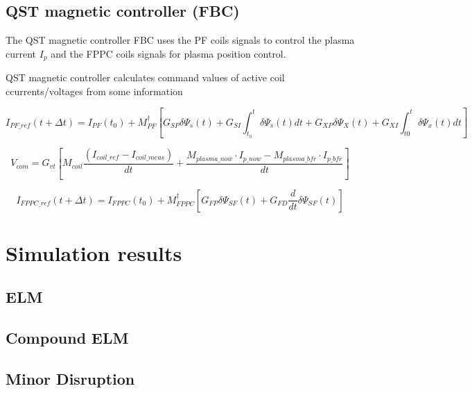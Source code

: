 \subsection{QST magnetic controller (FBC)}


The QST magnetic controller FBC uses the PF coils signals to control the plasma current $I_p$ and the FPPC coils signals for plasma position control.

QST magnetic controller calculates command values of active coil ccurrents/voltages from some information

\begin{equation}
I_{PF\_ref}(t+\Delta t) = I_{PF}(t_0)+M^\dagger_{PF}\left[G_{SP}\delta\Psi_s(t)+G_{SI}\int_{t_0}^{t}\delta\Psi_s(t)dt+G_{XP}\delta\Psi_X(t)+G_{XI}\int_{t0}^{t}\delta\Psi_x(t)dt\right]
\end{equation}

\begin{equation}
V_{com}=G_{vt}\left[M_{coil}\frac{(I_{coil\_ref}-I_{coil\_meas})}{dt}+ \frac{M_{plasma\_now} \cdot I_{p\_now} - M_{plasma\_ bfr} \cdot I_{p\_bfr}}{dt}\right]
\end{equation}

\begin{equation}
I_{FPPC\_ref}(t+\Delta t)=I_{FPPC}(t_0)+ M^\dagger_{FPPC}\left[G_{FP}\delta \Psi_{SF}(t) + G_{FD}\frac{d}{dt}\delta\Psi_{SF}(t) \right]
\end{equation}
\section{Simulation results}	

\subsection{ELM}
\subsection{Compound ELM}
\subsection{Minor Disruption}